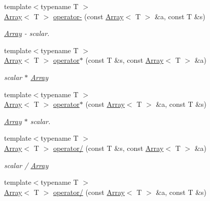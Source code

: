 \begin{DoxyCompactItemize}
{\footnotesize template$<$typename T $>$ }\\\mbox{\hyperlink{classXMLArray_1_1Array}{Array}}$<$ T $>$ \mbox{\hyperlink{namespaceXMLArray_acf50974b3d3fee37dd81c3ad47b2715d}{operator-\/}} (const \mbox{\hyperlink{classXMLArray_1_1Array}{Array}}$<$ T $>$ \&a, const T \&s)
\begin{DoxyCompactList}\small\item\em \mbox{\hyperlink{classXMLArray_1_1Array}{Array}} -\/ scalar. \end{DoxyCompactList}\item 
{\footnotesize template$<$typename T $>$ }\\\mbox{\hyperlink{classXMLArray_1_1Array}{Array}}$<$ T $>$ \mbox{\hyperlink{namespaceXMLArray_aaa1966396ac690ebef94472a82eb3aff}{operator$\ast$}} (const T \&s, const \mbox{\hyperlink{classXMLArray_1_1Array}{Array}}$<$ T $>$ \&a)
\begin{DoxyCompactList}\small\item\em scalar $\ast$ \mbox{\hyperlink{classXMLArray_1_1Array}{Array}} \end{DoxyCompactList}\item 
{\footnotesize template$<$typename T $>$ }\\\mbox{\hyperlink{classXMLArray_1_1Array}{Array}}$<$ T $>$ \mbox{\hyperlink{namespaceXMLArray_afa646c57d753c6caf977c840d370394e}{operator$\ast$}} (const \mbox{\hyperlink{classXMLArray_1_1Array}{Array}}$<$ T $>$ \&a, const T \&s)
\begin{DoxyCompactList}\small\item\em \mbox{\hyperlink{classXMLArray_1_1Array}{Array}} $\ast$ scalar. \end{DoxyCompactList}\item 
{\footnotesize template$<$typename T $>$ }\\\mbox{\hyperlink{classXMLArray_1_1Array}{Array}}$<$ T $>$ \mbox{\hyperlink{namespaceXMLArray_a664f129a59f9d36a6e46ee4af2de6116}{operator/}} (const T \&s, const \mbox{\hyperlink{classXMLArray_1_1Array}{Array}}$<$ T $>$ \&a)
\begin{DoxyCompactList}\small\item\em scalar / \mbox{\hyperlink{classXMLArray_1_1Array}{Array}} \end{DoxyCompactList}\item 
{\footnotesize template$<$typename T $>$ }\\\mbox{\hyperlink{classXMLArray_1_1Array}{Array}}$<$ T $>$ \mbox{\hyperlink{namespaceXMLArray_a719499a85d182af00fc9ecd23c8928e0}{operator/}} (const \mbox{\hyperlink{classXMLArray_1_1Array}{Array}}$<$ T $>$ \&a, const T \&s)

\end{DoxyCompactItemize}
